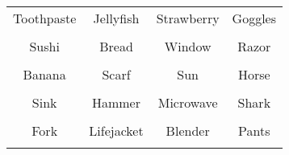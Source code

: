 \documentclass[12pt,a4paper]{article}
\begin{document}
\thispagestyle{empty}
\begin{table}[]
\centering
\Huge
\begin{tabular}{cccc}
 Toothpaste& Jellyfish& Strawberry& Goggles\\  & & & \\
 Sushi& Bread& Window& Razor\\  & & & \\
 Banana& Scarf& Sun& Horse\\  & & & \\
 Sink& Hammer& Microwave& Shark\\  & & & \\
 Fork& Lifejacket& Blender& Pants\\  & & & \\
\end{tabular}
\end{table}
\end{document}
